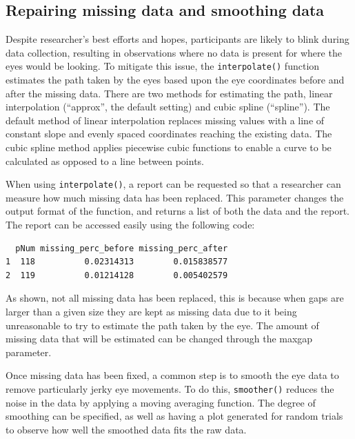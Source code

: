 \documentclass[
  man,
  floatsintext,
  longtable,
  nolmodern,
  notxfonts,
  notimes,
  colorlinks=true,linkcolor=blue,citecolor=blue,urlcolor=blue]{apa7}
\begin{document}
\subsection{Repairing missing data and smoothing
data}\label{repairing-missing-data-and-smoothing-data}

Despite researcher's best efforts and hopes, participants are likely to
blink during data collection, resulting in observations where no data is
present for where the eyes would be looking. To mitigate this issue, the
\texttt{interpolate()} function estimates the path taken by the eyes
based upon the eye coordinates before and after the missing data. There
are two methods for estimating the path, linear interpolation
(``approx'', the default setting) and cubic spline (``spline''). The
default method of linear interpolation replaces missing values with a
line of constant slope and evenly spaced coordinates reaching the
existing data. The cubic spline method applies piecewise cubic functions
to enable a curve to be calculated as opposed to a line between points.

When using \texttt{interpolate()}, a report can be requested so that a
researcher can measure how much missing data has been replaced. This
parameter changes the output format of the function, and returns a list
of both the data and the report. The report can be accessed easily using
the following code:

\begin{verbatim}
  pNum missing_perc_before missing_perc_after
1  118          0.02314313        0.015838577
2  119          0.01214128        0.005402579
\end{verbatim}

As shown, not all missing data has been replaced, this is because when
gaps are larger than a given size they are kept as missing data due to
it being unreasonable to try to estimate the path taken by the eye. The
amount of missing data that will be estimated can be changed through the
maxgap parameter.

Once missing data has been fixed, a common step is to smooth the eye
data to remove particularly jerky eye movements. To do this,
\texttt{smoother()} reduces the noise in the data by applying a moving
averaging function. The degree of smoothing can be specified, as well as
having a plot generated for random trials to observe how well the
smoothed data fits the raw data.
\end{document}
